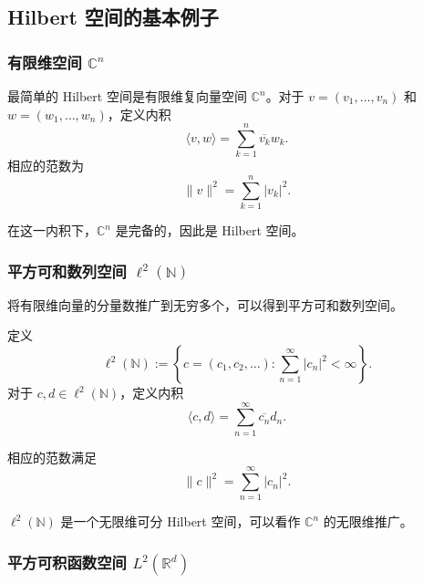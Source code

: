 \documentclass[UTF8,a4paper,11pt,openany]{ctexbook}
\begin{document}
\subsection{Hilbert 空间的基本例子}

\subsubsection{有限维空间 $\mathbb C^n$}

最简单的 Hilbert 空间是有限维复向量空间 $\mathbb C^n$。对于 $v=(v_1,\ldots,v_n)$ 和 $w=(w_1,\ldots,w_n)$，定义内积
\begin{equation}
    \langle v,w\rangle
    =
    \sum_{k=1}^{n}\overline{v_k}w_k.
\end{equation}
相应的范数为
\[
\|v\|^2
=
\sum_{k=1}^{n}|v_k|^2.
\]

在这一内积下，$\mathbb C^n$ 是完备的，因此是 Hilbert 空间。

\subsubsection{平方可和数列空间 $\ell^2(\mathbb N)$}

将有限维向量的分量数推广到无穷多个，可以得到平方可和数列空间。

\begin{definition}
定义
\begin{equation}
    \ell^2(\mathbb N)
    :=
    \left\{
    c=(c_1,c_2,\ldots):
    \sum_{n=1}^{\infty}|c_n|^2<\infty
    \right\}.
\end{equation}
对于 $c,d\in\ell^2(\mathbb N)$，定义内积
\begin{equation}
    \langle c,d\rangle
    =
    \sum_{n=1}^{\infty}\overline{c_n}d_n.
\end{equation}
\end{definition}

相应的范数满足
\[
\|c\|^2
=
\sum_{n=1}^{\infty}|c_n|^2.
\]

$\ell^2(\mathbb N)$ 是一个无限维可分 Hilbert 空间，可以看作 $\mathbb C^n$ 的无限维推广。

\subsubsection{平方可积函数空间 $L^2(\mathbb R^d)$}
\end{document}
